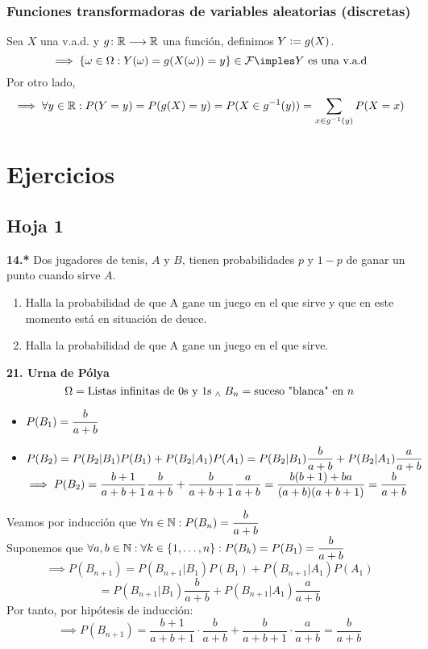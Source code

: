 \subsubsection{Funciones transformadoras de variables aleatorias (discretas)}
Sea $X$ una v.a.d. y $g \colon \mathbb{R} \longrightarrow \mathbb{R}$ una función, definimos $Y\vcentcolon= g(X)$.
\[\implies \{\omega \in\Omega:Y(\omega)=g(X(\omega))=y\} \in \F \imples Y\tex{ es una v.a.d}\]
Por otro lado, 
\[\implies \forall y \in \mathbb{R}:P(Y=y)=P(g(X)=y)=P(X\in g^{-1}(y))=\sum_{x\in g^{-1}(y)}P(X=x)\]


\section{Ejercicios}
\subsection{Hoja 1}

\noindent \textbf{14.*} Dos jugadores de tenis, $A$ y $B$, tienen probabilidades $p$ y $1-p$ de ganar un punto cuando sirve $A$.
\begin{enumerate}
    \item Halla la probabilidad de que A gane un juego en el que sirve y que en este momento está en situación de deuce.
    \item Halla la probabilidad de que A gane un juego en el que sirve.
\end{enumerate}

\noindent \textbf{21. Urna de Pólya}
\[\Omega= \text{Listas infinitas de $0$s y $1$s} \; _{\wedge} \; B_n=\text{suceso "blanca" en }n\]
\begin{itemize}%
    \item $\displaystyle P(B_1)=\frac{b}{a+b}$
    \item $\displaystyle P(B_2)=P(B_2|B_1)P(B_1)+P(B_2|A_1)P(A_1)=P(B_2|B_1)\frac{b}{a+b}+P(B_2|A_1)\frac{a}{a+b}$ \\
    $\displaystyle \implies P(B_2)=\frac{b+1}{a+b+1}\frac{b}{a+b}+\frac{b}{a+b+1}\frac{a}{a+b}=\frac{b(b+1)+ba}{(a+b)(a+b+1)}=\frac{b}{a+b}$
\end{itemize}
\begin{dem}
    Veamos por inducción que $\displaystyle \forall n \in \mathbb{N} :P(B_n)=\frac{b}{a+b}$ \\
    Suponemos que $\displaystyle \forall a,b \in \mathbb{N}: \forall k \in \{1, \dots, n\}:P(B_k)=P(B_1)=\frac{b}{a+b}$
    \[\implies P(B_{n+1})=P(B_{n+1}|B_1)P(B_1)+P(B_{n+1}|A_1)P(A_1)\]
    \[=P(B_{n+1}|B_1)\frac{b}{a+b}+P(B_{n+1}|A_1)\frac{a}{a+b}\]
    Por tanto, por hipótesis de inducción:
    \[\implies P(B_{n+1})=\frac{b+1}{a+b+1}\cdot\frac{b}{a+b} + \frac{b}{a+b+1}\cdot\frac{a}{a+b}=\frac{b}{a+b}\]
\end{dem}






